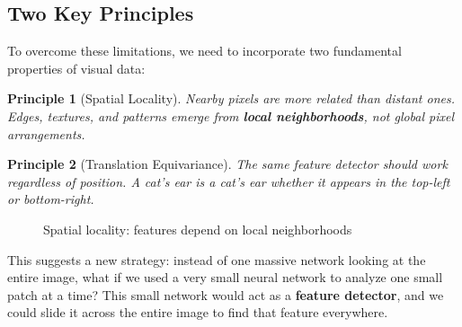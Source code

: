 \documentclass{article}
\newtheorem{principle}{Principle}
\begin{document}
\subsection{Two Key Principles}

To overcome these limitations, we need to incorporate two fundamental properties of visual data:

\begin{principle}[Spatial Locality]
Nearby pixels are more related than distant ones. Edges, textures, and patterns emerge from \textbf{local neighborhoods}, not global pixel arrangements.
\end{principle}

\begin{principle}[Translation Equivariance]
The same feature detector should work regardless of position. A cat's ear is a cat's ear whether it appears in the top-left or bottom-right.
\end{principle}

\begin{figure}[h]
\centering
{}
\caption{Spatial locality: features depend on local neighborhoods}
\end{figure}



This suggests a new strategy: instead of one massive network looking at the entire image, what if we used a very small neural network to analyze one small patch at a time? This small network would act as a \textbf{feature detector}, and we could slide it across the entire image to find that feature everywhere.
\end{document}
